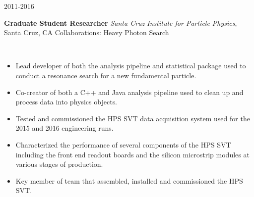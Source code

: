 \documentclass[11pt]{article}
\newcommand{\experienceentrycollab}[6] { 
    \noindent
    \begin{minipage}[t]{0.15\textwidth} \begin{flushright} #1 \end{flushright} \end{minipage} \hspace{0.01\textwidth}
    \begin{minipage}[t]{0.84\textwidth} 
        \textbf{#2} \newline
        \emph{#3}, #4 \newline
        Collaborations: #5
    \end{minipage} \\[0.01pt]
    #6 \vspace{11pt}
}
\begin{document}
        \experienceentrycollab{2011-2016}
                        {Graduate Student Researcher}
                        {Santa Cruz Institute for Particle Physics}
                        {Santa Cruz, CA}
                        {Heavy Photon Search}
                        {   
                            \begin{itemize}[label=\textcolor{indigodye}{$\circ$}, noitemsep, nolistsep, leftmargin=0.19\textwidth]
                                \item Lead developer of both the analysis pipeline and statistical package
                                      used to conduct a resonance search for a new fundamental particle.
                              \item Co-creator of both a C++ and Java analysis pipeline used to clean up and process
                                    data into physics objects.
                              \item Tested and commissioned the HPS SVT data acquisition system used for the 2015 and
                                    2016 engineering runs. 
                              \item Characterized the performance of several 
                                    components of the HPS SVT including the front end readout boards and the silicon 
                                    microstrip modules at various stages of production.
                              \item Key member of team that assembled, installed and commissioned the HPS SVT.
                          \end{itemize} 
                      } 
\end{document}
